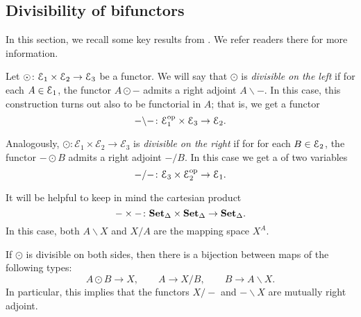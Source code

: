 \documentclass[main.tex]{subfiles}
\begin{document}
\subsection{Divisibility of bifunctors}
\label{sss:divisibility_of_bifunctors}

In this section, we recall some key results from \cite{qcats_vs_segal_spaces}. We refer readers there for more information.

Let $\odot\colon \mathcal{E}_{1} \times \mathcal{E}_{2} \to \mathcal{E}_{3}$ be a functor. We will say that $\odot$ is \emph{divisible on the left} if for each $A \in \mathcal{E}_{1}$, the functor $A \odot -$ admits a right adjoint $A \backslash -$. In this case, this construction turns out also to be functorial in $A$; that is, we get a functor
\begin{equation*}
  - \backslash -\colon \mathcal{E}_{1}^{\mathrm{op}} \times \mathcal{E}_{3} \to \mathcal{E}_{2}.
\end{equation*}

Analogously, $\odot\colon \mathcal{E}_{1} \times \mathcal{E}_{2} \to \mathcal{E}_{3}$ is \emph{divisible on the right} if for for each $B \in \mathcal{E}_{2}$, the functor $- \odot B$ admits a right adjoint $- / B$. In this case we get a of two variables
\begin{equation*}
  - / -\colon \mathcal{E}_{3} \times \mathcal{E}_{2}^{\mathrm{op}} \to \mathcal{E}_{1}.
\end{equation*}

\begin{example}
  It will be helpful to keep in mind the cartesian product 
  \begin{equation*}
    - \times -\colon \mathbf{Set}_{\Delta} \times \mathbf{Set}_{\Delta} \to \mathbf{Set}_{\Delta}. 
  \end{equation*}
  In this case, both $A \backslash X$ and $X / A$ are the mapping space $X^{A}$.
\end{example}

If $\odot$ is divisible on both sides, then there is a bijection between maps of the following types:
\begin{equation*}
  A \odot B \to X,\qquad A \to X / B,\qquad B \to A \backslash X.
\end{equation*}
In particular, this implies that the functors $X / -$ and $- \backslash X$ are mutually right adjoint.
\end{document}
